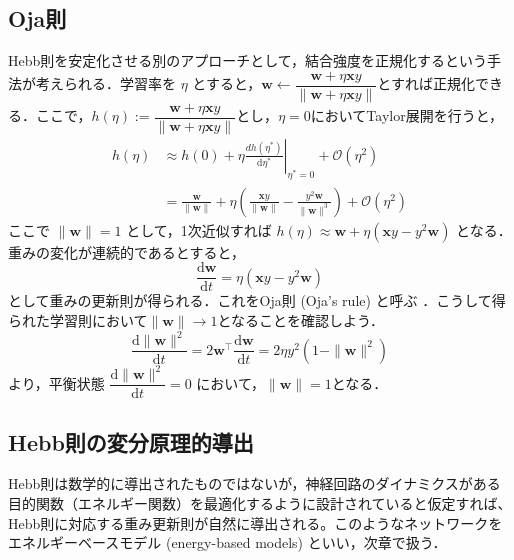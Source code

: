 \documentclass[titlepage]{ltjsbook}
\begin{document}
\subsection{Oja則}
Hebb則を安定化させる別のアプローチとして，結合強度を正規化するという手法が考えられる．学習率を $\eta$ とすると，$\mathbf{w}\leftarrow\dfrac{\mathbf{w}+\eta \mathbf{x}y}{\|\mathbf{w}+\eta \mathbf{x}y\|}$とすれば正規化できる．ここで，$h(\eta):=\dfrac{\mathbf{w}+\eta \mathbf{x}y}{\|\mathbf{w}+\eta \mathbf{x}y\|}$とし，$\eta=0$においてTaylor展開を行うと，
\begin{align}
h(\eta)&\approx h(0) + \eta \left.\frac{dh(\eta^*)}{\mathrm{d}\eta^*}\right|_{\eta^*=0} + \mathcal{O}(\eta^2)\\
&=\frac{\mathbf{w}}{\|\mathbf{w}\|} + \eta \left(\frac{\mathbf{x}y}{\|\mathbf{w}\|}-\frac{y^2\mathbf{w}}{\|\mathbf{w}\|^3}\right)+ \mathcal{O}(\eta^2)
\end{align}
ここで $\|\mathbf{w}\|=1$ として，1次近似すれば $h(\eta)\approx \mathbf{w} + \eta \left(\mathbf{x}y-y^2 \mathbf{w}\right)$ となる．重みの変化が連続的であるとすると，
\begin{equation}
\frac{\mathrm{d}\mathbf{w}}{\mathrm{d}t} = \eta \left(\mathbf{x}y-y^2 \mathbf{w}\right)
\end{equation}
として重みの更新則が得られる．これをOja則 (Oja's rule) と呼ぶ \citep{Oja1982-yd}．こうして得られた学習則において$\|\mathbf{w}\|\to 1$となることを確認しよう．
\begin{equation}
\frac{\mathrm{d}\|\mathbf{w}\|^2}{\mathrm{d}t}=2\mathbf{w}^\top\frac{\mathrm{d}\mathbf{w}}{\mathrm{d}t}= 2\eta y^2\left(1-\|\mathbf{w}\|^2\right)
\end{equation}
より，平衡状態 $\dfrac{\mathrm{d}\|\mathbf{w}\|^2}{\mathrm{d}t}=0$ において，$\|\mathbf{w}\|= 1$となる．

\subsection{Hebb則の変分原理的導出}
Hebb則は数学的に導出されたものではないが，神経回路のダイナミクスがある目的関数（エネルギー関数）を最適化するように設計されていると仮定すれば、Hebb則に対応する重み更新則が自然に導出される。このようなネットワークをエネルギーベースモデル (energy-based models) といい，次章で扱う．
\end{document}
